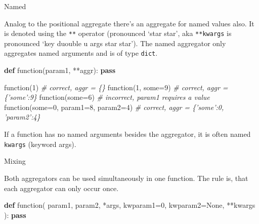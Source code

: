 \documentclass[ignorenonframetext,]{beamer}
\newenvironment{Shaded}{}{}
\newcommand{\KeywordTok}[1]{\textcolor[rgb]{0.00,0.44,0.13}{\textbf{{#1}}}}
\newcommand{\DecValTok}[1]{\textcolor[rgb]{0.25,0.63,0.44}{{#1}}}
\newcommand{\CommentTok}[1]{\textcolor[rgb]{0.38,0.63,0.69}{\textit{{#1}}}}
\newcommand{\OtherTok}[1]{\textcolor[rgb]{0.00,0.44,0.13}{{#1}}}
\newcommand{\NormalTok}[1]{{#1}}
\begin{document}
\begin{frame}[fragile]

\begin{block}{Named}

Analog to the positional aggregate there's an aggregate for named values
also. It is denoted using the \texttt{**} operator (pronounced `star
star', aka \texttt{**kwargs} is pronounced `key duouble u args star
star'). The named aggregator only aggregates named arguments and is of
type \texttt{dict}.

\begin{Shaded}
\begin{Highlighting}[]
\KeywordTok{def} \NormalTok{function(param1, **aggr):}
    \KeywordTok{pass}

\NormalTok{function(}\DecValTok{1}\NormalTok{)  }\CommentTok{# correct, aggr = \{\}}
\NormalTok{function(}\DecValTok{1}\NormalTok{, some=}\DecValTok{9}\NormalTok{)  }\CommentTok{# correct, aggr = \{'some':9\}}
\NormalTok{function(some=}\DecValTok{6}\NormalTok{)  }\CommentTok{# incorrect, param1 requires a value}
\NormalTok{function(some=}\DecValTok{0}\NormalTok{, param1=}\DecValTok{8}\NormalTok{, param2=}\DecValTok{4}\NormalTok{)  }
\CommentTok{# correct, aggr = \{'some':0, 'param2':4\}}
\end{Highlighting}
\end{Shaded}

If a function has no named arguments besides the aggregator, it is often
named \texttt{kwargs} (keyword args).

\end{block}

\end{frame}

\begin{frame}[fragile]

\begin{block}{Mixing}

Both aggregators can be used simultaneously in one function. The rule
is, that each aggregator can only occur once.

\begin{Shaded}
\begin{Highlighting}[]
\KeywordTok{def} \NormalTok{function(}
        \NormalTok{param1,}
        \NormalTok{param2,}
        \NormalTok{*args,}
        \NormalTok{kwparam1=}\DecValTok{0}\NormalTok{,}
        \NormalTok{kwparam2=}\OtherTok{None}\NormalTok{,}
        \NormalTok{**kwargs}
    \NormalTok{):}
    \KeywordTok{pass}
\end{Highlighting}
\end{Shaded}

\end{block}

\end{frame}
\end{document}
